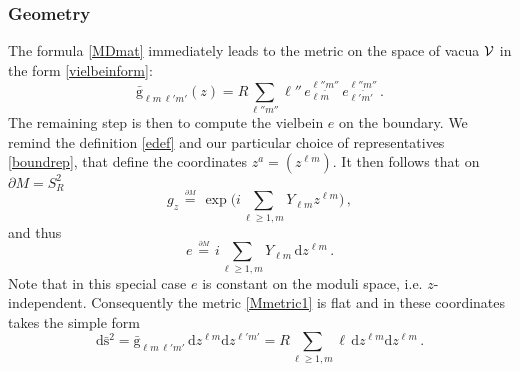 \documentclass[11pt,a4paper]{article}
\def\calv{{\cal V}}
\def\pd{\partial}
\def\rg{{\mathrm{g}}}
\def\rd{{\mathrm{d}}}
\def\boundeq{{\stackrel{\ {}_{\partial M_{\,{}_{}}}}{=}}}
\begin{document}
          	\subsubsection{Geometry}
	        The formula \eqref{MDmat} immediately leads to the metric on the space of vacua $\calv$ in the form \eqref{vielbeinform}:
	        \begin{equation}
	        \bar{\rg}_{\ell m\,\ell'm'}(z)=R\sum_{\ell''m''}\ell''\,e_{\ell m}^{\underline{\ell''m''}}\,e_{\ell' m'}^{\underline{\ell''m''}}\,.\label{Mmetric1}
	        \end{equation}
	        The remaining step is then to compute the vielbein $e$ on the boundary. We remind the definition \eqref{edef} and our particular choice of representatives \eqref{boundrep}, that define the coordinates $z^a=(z^{\ell m})$. It then follows that on $\pd M=S^2_R$
	        \begin{equation}
	        g_z\boundeq\exp\Big(i\sum_{\ell\geq 1, m}Y_{\ell m}z^{\ell m}\Big)\,,
	        \end{equation}
	        and thus
	        \begin{equation}
	        e\boundeq i \sum_{\ell\geq 1, m}Y_{\ell m}\,\rd z^{\ell m}\,.
	        \end{equation}
	        Note that in this special case $e$ is constant on the moduli space, i.e. $z$-independent. Consequently the metric \eqref{Mmetric1} is flat and in these coordinates takes the simple form
	        \begin{equation}
	        \rd\bar{\mathrm{s}}^2=\bar{\rg}_{\ell m\,\ell'm'}\,\rd z^{\ell m}\rd z^{\ell'm'}=R\sum_{\ell\geq 1, m}\!\ell\, \rd z^{\ell m}\rd z^{\ell m}\,. \label{Mmetric2}
	        \end{equation}
\end{document}
